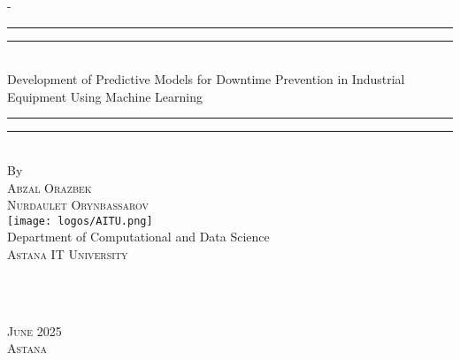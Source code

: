 \begin{titlingpage}
\begin{SingleSpace}
\calccentering{\unitlength} 
\begin{adjustwidth*}{\unitlength}{-\unitlength}
\vspace*{5mm}
\begin{center}
\rule[0.5ex]{\linewidth}{2pt}\vspace*{-\baselineskip}\vspace*{3.2pt}
\rule[0.5ex]{\linewidth}{1pt}\\[\baselineskip]
{
\linespread{2.0} \selectfont
%
{\HUGE Development of Predictive Models for Downtime Prevention in Industrial Equipment Using Machine Learning }\\[4mm]
}

%
\rule[0.5ex]{\linewidth}{1pt}\vspace*{-\baselineskip}\vspace{3.2pt}
\rule[0.5ex]{\linewidth}{2pt}\\
\vspace{6.5mm}
{\large By}\\
\vspace{6.5mm}
{\large\textsc{Abzal Orazbek}}\\
\vspace{3mm}
{\large\textsc{Nurdaulet Orynbassarov}}\\
\vspace{11mm}
\texttt{[image: logos/AITU.png]}\\
\vspace{6mm}
{\large Department of Computational and Data Science\\
\textsc{Astana IT University}}\\
\vspace{20mm}
\begin{minipage}{10cm}
 \\
\end{minipage}\\
\vspace{30mm}
{\large\textsc{June 2025}}\\
{\large\textsc{Astana}}
\vspace{1mm}
\end{center}
\end{adjustwidth*}
\end{SingleSpace}
\end{titlingpage}